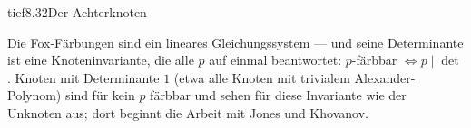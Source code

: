 \begin{loesungkarte}{tief}{8.32}{Der Achterknoten}
\begin{mitnehmen}\kastentext
Die Fox-Färbungen sind ein lineares Gleichungssystem --- und seine Determinante ist eine Knoteninvariante, die alle $p$ auf einmal beantwortet: $p$-färbbar $\iff p\mid\det$. Knoten mit Determinante $1$ (etwa alle Knoten mit trivialem Alexander-Polynom) sind für kein $p$ färbbar und sehen für diese Invariante wie der Unknoten aus; dort beginnt die Arbeit mit Jones und Khovanov.
\end{mitnehmen}
\end{loesungkarte}


